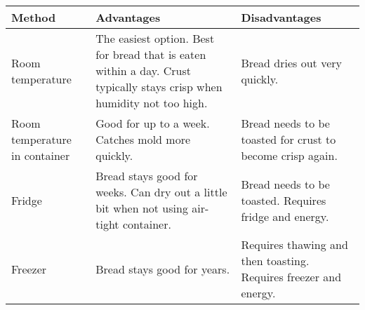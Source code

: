 \def\arraystretch{1.6}
\begin{tabular}{@{}p{}p{}p{}@{}}
\toprule
\textbf{Method}     & \textbf{Advantages}            & \textbf{Disadvantages}       \\
\midrule
Room temperature              & The easiest option. Best for bread that is eaten within a day.
                                Crust typically stays crisp when humidity not too high.
                              & Bread dries out very quickly.\\

Room temperature in container & Good for up to a week. Catches mold more quickly.
                              & Bread needs to be toasted for crust to become crisp again.\\

Fridge                        & Bread stays good for weeks. Can dry out a little bit when not using air-tight container.
                              & Bread needs to be toasted. Requires fridge and energy.\\

Freezer                       & Bread stays good for years.
                              & Requires thawing and then toasting. Requires freezer and energy.\\
\bottomrule
\end{tabular}
